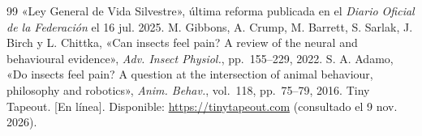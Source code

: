 \begin{thebibliography}{99}
 «Ley General de Vida Silvestre», última reforma publicada en el \textit{Diario Oficial de la Federación} el 16 jul. 2025.
 M. Gibbons, A. Crump, M. Barrett, S. Sarlak, J. Birch y L. Chittka, «Can insects feel pain? A review of the neural and behavioural evidence», \textit{Adv. Insect Physiol.}, pp.~155--229, 2022.
 S. A. Adamo, «Do insects feel pain? A question at the intersection of animal behaviour, philosophy and robotics», \textit{Anim. Behav.}, vol.~118, pp.~75--79, 2016.
 Tiny Tapeout. [En línea]. Disponible: \url{https://tinytapeout.com} (consultado el 9 nov. 2026).
\end{thebibliography}
